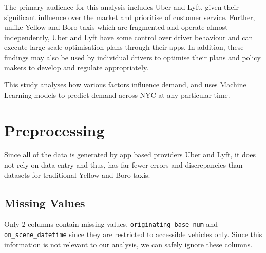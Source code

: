 \documentclass[11pt]{article}
\begin{document}
The primary audience for this analysis includes Uber and Lyft, given their significant influence over the market and prioritise of customer service. Further, unlike Yellow and Boro taxis which are fragmented and operate almost independently, Uber and Lyft have some control over driver behaviour and can execute large scale optimisation plans through their apps. In addition, these findings may also be used by individual drivers to optimise their plans and policy makers to develop and regulate appropriately.

This study analyses how various factors influence demand, and uses Machine Learning models to predict demand across NYC at any particular time.

\section{Preprocessing}
Since all of the data is generated by app based providers Uber and Lyft, it does not rely on data entry and thus, has far fewer errors and discrepancies than datasets for traditional Yellow and Boro taxis.

\subsection{Missing Values}
Only 2 columns contain missing values, \texttt{originating\_base\_num} and \texttt{on\_scene\_datetime} since they are restricted to accessible vehicles only. Since this information is not relevant to our analysis, we can safely ignore these columns.
\end{document}
